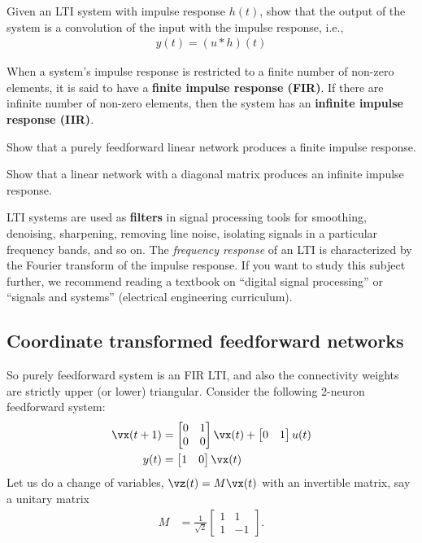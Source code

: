 \documentclass[a4paper,11pt]{exam}
\newcounter{ct}
\begin{document}
\begin{questions}
\question Given an LTI system with impulse response $h(t)$, show that the output of the system is a convolution of the input with the impulse response, i.e.,
\begin{align}
    y(t) = (u \ast h)(t)
\end{align}

\clearpage
When a system's impulse response is restricted to a finite number of non-zero elements, it is said to have a \textbf{finite impulse response (FIR)}.
If there are infinite number of non-zero elements, then the system has an \textbf{infinite impulse response (IIR)}.

\question Show that a purely feedforward linear network produces a finite impulse response.

\question Show that a linear network with a diagonal matrix produces an infinite impulse response.

LTI systems are used as \textbf{filters} in signal processing tools for smoothing, denoising, sharpening, removing line noise, isolating signals in a particular frequency bands, and so on.
The \emph{frequency response} of an LTI is characterized by the Fourier transform of the impulse response.
If you want to study this subject further, we recommend reading a textbook on ``digital signal processing'' or ``signals and systems'' (electrical engineering curriculum).

\subsection{Coordinate transformed feedforward networks}
So purely feedforward system is an FIR LTI, and also the connectivity weights are strictly upper (or lower) triangular.
\question \label{q:rotff}
Consider the following 2-neuron feedforward system:
\begin{align}\label{eq:dtlds:lti:1}
    \vx(t+1) &= 
    \begin{bmatrix}
	0 & 1\\
	0 & 0
    \end{bmatrix}
    \vx(t) + 
    \begin{bmatrix}
	0 & 1
    \end{bmatrix}
    u(t)
    \\
    y(t) &= 
    \begin{bmatrix}
	1 & 0
    \end{bmatrix}
    \vx(t)
\end{align}
Let us do a change of variables, $\vz(t) = M \vx(t)$ with an invertible matrix, say a unitary matrix
\begin{align}
    M &=
    \frac{1}{\sqrt{2}}
    \begin{bmatrix}
	1 & 1\\
	1 & -1
    \end{bmatrix}.
\end{align}
\begin{parts}

\end{parts}
\end{questions}
\end{document}
